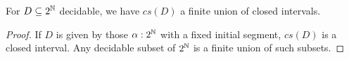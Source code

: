 %
%
%
%
\begin{lemma}\label{ImageDecidableClosedInterval}
  For $D\subseteq 2^{\mathbb{N}}$ decidable, we have $cs(D)$ a finite union of closed intervals. 
\end{lemma}
\begin{proof}
  If $D$ is given by those $\alpha:2^{\mathbb{N}}$ with a fixed initial segment, $cs(D)$ is a closed interval. 
  Any decidable subset of $2^{\mathbb{N}}$ is a finite union of such subsets. 
\end{proof}

